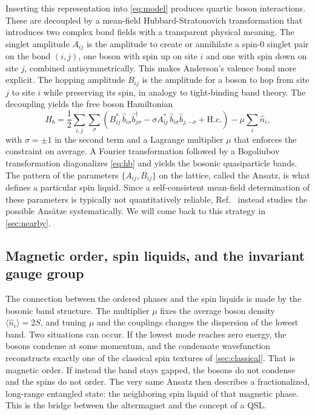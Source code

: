 \documentclass[11pt]{article}
\begin{document}
Inserting this representation into \cref{eq:model} produces quartic boson
interactions. These are decoupled by a mean-field Hubbard-Stratonovich
transformation that introduces two complex bond fields with a transparent
physical meaning. The singlet amplitude $A_{ij}$ is the amplitude to create or
annihilate a spin-0 singlet pair on the bond $(i,j)$, one boson with spin up on
site $i$ and one with spin down on site $j$, combined antisymmetrically. This makes
Anderson's valence bond more explicit. The hopping amplitude $B_{ij}$ is the
amplitude for a boson to hop from site $j$ to site $i$ while preserving its
spin, in analogy to tight-binding band theory. The decoupling yields the free
boson Hamiltonian
\begin{equation}
    \label{eq:hb}
    H_b = \frac{1}{2} \sum_{i,j} \sum_{\sigma}
    \left( B^{*}_{ij}\, \hat{b}_{i\sigma} \hat{b}^\dagger_{j\sigma}
    - \sigma A^{*}_{ij}\, \hat{b}_{i\sigma} \hat{b}_{j,-\sigma}
    + \mathrm{H.c.} \right)
    - \mu \sum_i \hat{n}_i,
\end{equation}
with $\sigma = \pm 1$ in the second term and a Lagrange multiplier $\mu$ that
enforces the constraint on average. A Fourier transformation followed by a
Bogoliubov transformation diagonalizes \cref{eq:hb} and yields the bosonic
quasiparticle bands. The pattern of the parameters $\{A_{ij}, B_{ij}\}$ on the
lattice, called the Ansatz, is what defines a particular spin liquid. Since a
self-consistent mean-field determination of these parameters is typically not
quantitatively reliable, Ref.~\cite{Sobral2025} instead studies the possible
Ansätze systematically. We will come back to this strategy in \cref{sec:nearby}.

\subsection{Magnetic order, spin liquids, and the invariant gauge group}
\label{sec:igg}

The connection between the ordered phases and the spin liquids is made by the
bosonic band structure. The multiplier $\mu$ fixes the average boson density
$\langle \hat{n}_i \rangle = 2S$, and tuning $\mu$ and the couplings changes
the dispersion of the lowest band. Two situations can occur. If the lowest mode
reaches zero energy, the bosons condense at some momentum, and the condensate
wavefunction reconstructs exactly one of the classical spin textures of
\cref{sec:classical}. That is magnetic order. If instead the band stays gapped,
the bosons do not condense and the spins do not order. The very same Ansatz
then describes a fractionalized, long-range entangled state: the neighboring
spin liquid of that magnetic phase. This is the bridge between the altermagnet
and the concept of a QSL.
\end{document}
